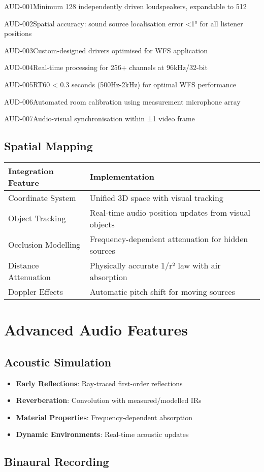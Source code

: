 \begin{requirement}{AUD-001}{Minimum 128 independently driven loudspeakers, expandable to 512}
\begin{requirement}{AUD-002}{Spatial accuracy: sound source localisation error <1° for all listener positions}
\begin{requirement}{AUD-003}{Custom-designed drivers optimised for WFS application}
\begin{requirement}{AUD-004}{Real-time processing for 256+ channels at 96kHz/32-bit}
\begin{requirement}{AUD-005}{RT60 < 0.3 seconds (500Hz-2kHz) for optimal WFS performance}
\begin{requirement}{AUD-006}{Automated room calibration using measurement microphone array}
\begin{requirement}{AUD-007}{Audio-visual synchronisation within ±1 video frame}
\subsection{Spatial Mapping}

\begin{table}[H]
\centering
\begin{tabularx}{\textwidth}{@{}lX@{}}
\toprule
\textbf{Integration Feature} & \textbf{Implementation} \\
\midrule
Coordinate System & Unified 3D space with visual tracking \\
Object Tracking & Real-time audio position updates from visual objects \\
Occlusion Modelling & Frequency-dependent attenuation for hidden sources \\
Distance Attenuation & Physically accurate 1/r² law with air absorption \\
Doppler Effects & Automatic pitch shift for moving sources \\
\bottomrule
\end{tabularx}
\end{table}

\section{Advanced Audio Features}

\subsection{Acoustic Simulation}

\begin{itemize}
    \item \textbf{Early Reflections}: Ray-traced first-order reflections
    \item \textbf{Reverberation}: Convolution with measured/modelled IRs
    \item \textbf{Material Properties}: Frequency-dependent absorption
    \item \textbf{Dynamic Environments}: Real-time acoustic updates
\end{itemize}

\subsection{Binaural Recording}


\end{requirement}
\end{requirement}
\end{requirement}
\end{requirement}
\end{requirement}
\end{requirement}
\end{requirement}
